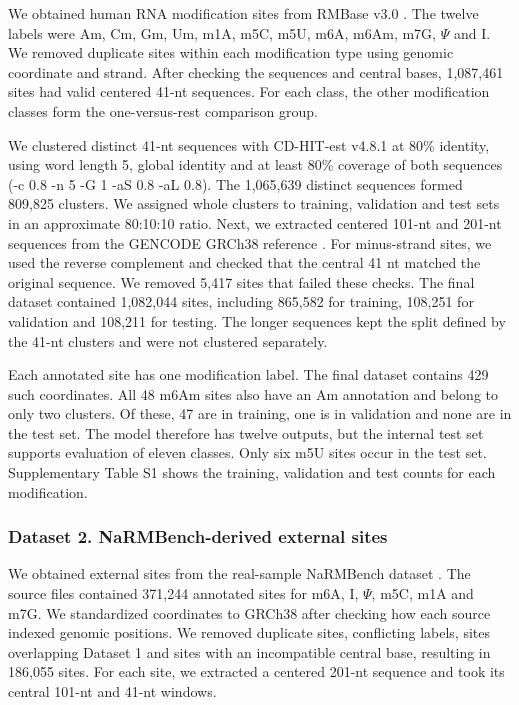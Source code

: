 \documentclass[unnumsec,webpdf,contemporary,large]{oup-authoring-template}
\begin{document}
We obtained human RNA modification sites from RMBase v3.0 \citep{ref24}. The twelve labels were Am, Cm, Gm, Um, m1A, m5C, m5U, m6A, m6Am, m7G, $\Psi$ and I. We removed duplicate sites within each modification type using genomic coordinate and strand. After checking the sequences and central bases, 1,087,461 sites had valid centered 41-nt sequences. For each class, the other modification classes form the one-versus-rest comparison group.

We clustered distinct 41-nt sequences with CD-HIT-est v4.8.1 \citep{ref25} at 80\% identity, using word length 5, global identity and at least 80\% coverage of both sequences (-c 0.8 -n 5 -G 1 -aS 0.8 -aL 0.8). The 1,065,639 distinct sequences formed 809,825 clusters. We assigned whole clusters to training, validation and test sets in an approximate 80:10:10 ratio. Next, we extracted centered 101-nt and 201-nt sequences from the GENCODE GRCh38 reference \citep{ref26}. For minus-strand sites, we used the reverse complement and checked that the central 41 nt matched the original sequence. We removed 5,417 sites that failed these checks. The final dataset contained 1,082,044 sites, including 865,582 for training, 108,251 for validation and 108,211 for testing. The longer sequences kept the split defined by the 41-nt clusters and were not clustered separately.

Each annotated site has one modification label. The final dataset contains 429 such coordinates. All 48 m6Am sites also have an Am annotation and belong to only two clusters. Of these, 47 are in training, one is in validation and none are in the test set. The model therefore has twelve outputs, but the internal test set supports evaluation of eleven classes. Only six m5U sites occur in the test set. Supplementary Table S1 shows the training, validation and test counts for each modification.

\subsubsection{Dataset 2. NaRMBench-derived external sites}

We obtained external sites from the real-sample NaRMBench dataset \citep{ref27}. The source files contained 371,244 annotated sites for m6A, I, $\Psi$, m5C, m1A and m7G. We standardized coordinates to GRCh38 after checking how each source indexed genomic positions. We removed duplicate sites, conflicting labels, sites overlapping Dataset 1 and sites with an incompatible central base, resulting in 186,055 sites. For each site, we extracted a centered 201-nt sequence and took its central 101-nt and 41-nt windows.
\end{document}
